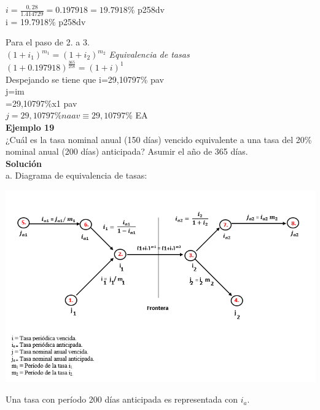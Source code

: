 $i=\frac{0,28}{1.414729} = 0.197918 = 19.7918\%$ p258dv\\

i = 19.7918\% p258dv


Para el paso de 2. a 3.\\

$(1 + i_{1})^{m_{1}} = (1+ i_{2})^{m_{2}}$ \hspace{35 pt}\textit{Equivalencia de tasas}\\
$(1 + 0.197918)^{\frac{365}{258}} = (1 + i)^1$ \\
Despejando se tiene que i=29,10797\% pav\\
j=im\\
=29,10797\%x1 pav\\
$j=29,10797\%naav \equiv 29,10797$\% EA\\

\textbf{Ejemplo 19}\\

¿Cuál es la tasa nominal anual (150 días) vencido equivalente a una tasa del 20\% nominal anual (200 días) anticipada? Asumir el año de 365 días.\\

\textbf{Solución}\\

a. Diagrama de equivalencia de tasas:

\begin{center}
	\includegraphics[height = 9.0 cm]{general}\\
\end{center}

Una tasa con período 200 días anticipada es representada con $i_{a}$.\\

